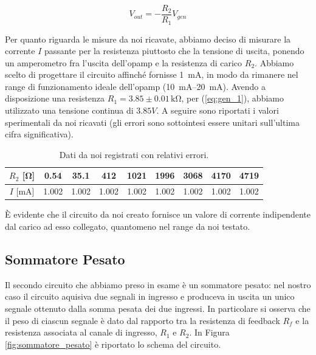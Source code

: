 $$V_{out}=-\frac{R_2}{R_1} V_{gen}$$

Per quanto riguarda le misure da noi ricavate, abbiamo deciso di misurare la corrente $I$ passante per la resistenza piuttosto che la tensione di uscita, ponendo un amperometro fra l'uscita dell'opamp e la resistenza di carico $R_2$.
Abbiamo scelto di progettare il circuito affinché fornisse \SI{1}{\milli\ampere}, in modo da rimanere nel range di funzionamento ideale dell'opamp (\SIrange{10}{20}{\milli\ampere}).
Avendo a disposizione una resistenza $R_1=3.85 \pm 0.01\,\si{\kilo\ohm}$, per (\ref{eq:gen_1}), abbiamo utilizzato una tensione continua di $3.85 V$. A seguire sono riportati i valori sperimentali da noi ricavati (gli errori sono sottointesi essere unitari sull'ultima cifra significativa).

\begin{table}[H]
\center
\caption{Dati da noi registrati con relativi errori.}
{\renewcommand{\arraystretch}{1.4}%
\begin{tabular}{c|c|c|c|c|c|c|c|c}
$R_2$ [\si{\ohm}] & 0.54 & 35.1 & 412 & 1021 & 1996 & 3068 & 4170 & 4719 \\ 
\hline 
$I$ [\si{\milli\ampere}] & 1.002 & 1.002 & 1.002 & 1.002 & 1.002 & 1.002 & 1.002 & 1.002 \\ 
\end{tabular}}
\end{table}


È evidente che il circuito da noi creato fornisce un valore di corrente indipendente dal carico ad esso collegato, quantomeno nel range da noi testato.

\subsection{Sommatore Pesato}

Il secondo circuito che abbiamo preso in esame è un sommatore pesato: nel nostro caso il circuito aquisiva due segnali in ingresso e produceva in uscita un unico segnale ottenuto dalla somma pesata dei due ingressi. In particolare si osserva che il peso di ciascun segnale è dato dal rapporto tra la resistenza di feedback $R_f$ e la resistenza associata al canale di ingresso, $R_1$ e $R_2$. In Figura \ref{fig:sommatore_pesato} è riportato lo schema del circuito.

